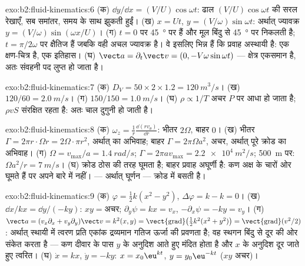 \begin{solution}{exo:b2:fluid-kinematics:6}
(क) $\dd y/\dd x = (V/U)\cos\omega t$: ढाल
$(V/U)\cos\omega t$ की सरल रेखाएँ, सब समांतर, समय के साथ झुकती हुईं। (ख) $x = Ut$, $y =
(V/\omega)\sin\omega t$: अर्थात् ज्यावक्र $y = (V/\omega)\sin(\omega x/U)$। (ग)
$t = 0$ पर  \qty{45}{\degree} पर हैं और  मूल बिंदु से
\qty{45}{\degree} पर निकलती है; $t = \pi/2\omega$ पर 
क्षैतिज हैं जबकि  वही अचल ज्यावक्र है। वे इसलिए भिन्न हैं कि
प्रवाह अस्थायी है:  एक क्षण-चित्र है,  एक इतिहास।
(घ) $\vect a = \partial_t\vect v = (0, -V\omega\sin\omega t)$ --- क्षेत्र
एकसमान है, अतः संवहनी पद लुप्त हो जाता है।
\end{solution}

\begin{solution}{exo:b2:fluid-kinematics:7}
(क) $D_V = 50 \times 2 \times 1.2 = \qty{120}{m^3/s}$। (ख) $120/60 = \qty{2.0}{m/s}$।
(ग) $150/150 = \qty{1.0}{m/s}$। (घ) $\rho \propto 1/T$ अचर $P$ पर आधा हो जाता है;
$\rho vS$ संरक्षित रहता है: अतः चाल दुगुनी हो जाती है।
\end{solution}

\begin{solution}{exo:b2:fluid-kinematics:8}
(क) $\omega_z = \frac1r\frac{\dd(rv_\theta)}{\dd r}$: भीतर $2\Omega$, बाहर $0$।
(ख) भीतर $\Gamma = 2\pi r\cdot\Omega r = 2\Omega\cdot\pi r^2$, अर्थात् 
का अभिवाह; बाहर $\Gamma = 2\pi\Omega a^2$, अचर, अर्थात् पूरे क्रोड
का अभिवाह। (ग) $\Omega = v_{\max}/a = \qty{1.4}{rad/s}$; $\Gamma = 2\pi av_{\max}
= \qty{2.2e4}{m^2/s}$; \qty{500}{m} पर: $\Omega a^2/r = \qty{7}{m/s}$। (घ)
क्रोड ठोस की तरह घूमता है; बाहर प्रवाह अघूर्णी है: कण
अक्ष के चारों ओर घूमते हैं पर अपने बारे में नहीं।  ---
अर्थात् घूर्णन --- क्रोड में बसती है।
\end{solution}

\begin{solution}{exo:b2:fluid-kinematics:9}
(क) $\varphi = \tfrac12k(x^2 - y^2)$, $\Delta\varphi = k - k = 0$। (ख) $\dd x/
kx = \dd y/(-ky)$: $xy = \text{अचर}$; $\partial_y\psi = kx = v_x$, $-\partial_x\psi =
-ky = v_y$। (ग) $\vect a = (v_x\partial_x + v_y\partial_y)\vect v = k^2(x, y) =
\operatorname{\vect{grad}}\bigl(\tfrac12k^2(x^2 + y^2)\bigr) = \operatorname{\vect{grad}}
(v^2/2)$: अर्थात् स्थायी  में त्वरण प्रति एकांक द्रव्यमान
गतिज ऊर्जा की प्रवणता है; वह स्थगन बिंदु से दूर की ओर संकेत करता है ---
कण दीवार के पास $y$ के अनुदिश आते हुए मंदित होता है और $x$ के अनुदिश दूर जाते हुए त्वरित। (घ) $\dot x = kx$, $\dot y = -ky$:
$x = x_0\eu^{kt}$, $y = y_0\eu^{-kt}$ ($xy$ अचर)।
\end{solution}

